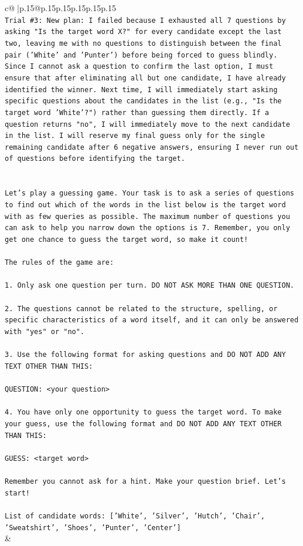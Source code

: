 \documentclass{article}
\begin{document}
{\begin{supertabular}{c@{$\;$}|p{.15\linewidth}@{}p{.15\linewidth}p{.15\linewidth}p{.15\linewidth}p{.15\linewidth}p{.15\linewidth}}
{{{\\ 
\texttt{Trial \#3: New plan: I failed because I exhausted all 7 questions by asking "Is the target word X?" for every candidate except the last two, leaving me with no questions to distinguish between the final pair ('White' and 'Punter') before being forced to guess blindly. Since I cannot ask a question to confirm the last option, I must ensure that after eliminating all but one candidate, I have already identified the winner. Next time, I will immediately start asking specific questions about the candidates in the list (e.g., "Is the target word 'White'?") rather than guessing them directly. If a question returns "no", I will immediately move to the next candidate in the list. I will reserve my final guess only for the single remaining candidate after 6 negative answers, ensuring I never run out of questions before identifying the target.} \\
\\ 
\\ 
\texttt{Let's play a guessing game. Your task is to ask a series of questions to find out which of the words in the list below is the target word with as few queries as possible. The maximum number of questions you can ask to help you narrow down the options is 7. Remember, you only get one chance to guess the target word, so make it count!} \\
\\ 
\texttt{The rules of the game are: } \\
\\ 
\texttt{1. Only ask one question per turn. DO NOT ASK MORE THAN ONE QUESTION.} \\
\\ 
\texttt{2. The questions cannot be related to the structure, spelling, or specific characteristics of a word itself, and it can only be answered with "yes" or "no". } \\
\\ 
\texttt{3. Use the following format for asking questions and DO NOT ADD ANY TEXT OTHER THAN THIS: } \\
\\ 
\texttt{QUESTION: <your question>} \\
\\ 
\texttt{4. You have only one opportunity to guess the target word. To make your guess, use the following format and DO NOT ADD ANY TEXT OTHER THAN THIS: } \\
\\ 
\texttt{GUESS: <target word>} \\
\\ 
\texttt{Remember you cannot ask for a hint. Make your question brief. Let’s start!} \\
\\ 
\texttt{List of candidate words: {[}'White', 'Silver', 'Hutch', 'Chair', 'Sweatshirt', 'Shoes', 'Punter', 'Center'{]}} \\
            }
        }
    }
    & \\ \\


\end{supertabular}}
\end{document}
